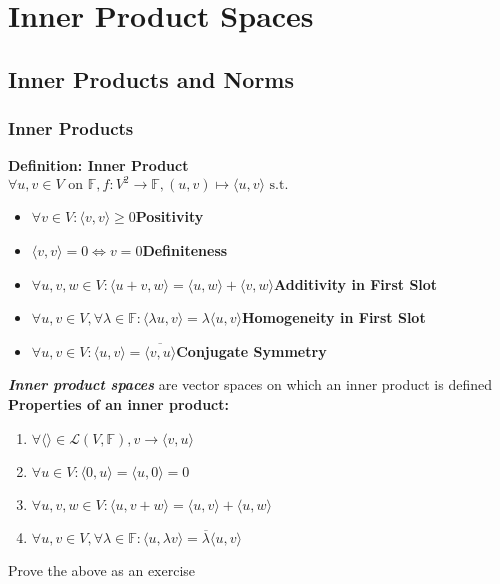 \documentclass{article}
\newcommand{\F}{\mathbb{F}}
\newcommand{\st}{\mbox{ s.t. }}
\newcommand{\0}{{\bf{0}}}
\begin{document}
\section{Inner Product Spaces}
\subsection{Inner Products and Norms}
\subsubsection{Inner Products}
\textbf{Definition: Inner Product}\\
$\forall u,v\in V\mbox{ on }\F,f:V^2\to\F,(u,v)\mapsto\langle u,v\rangle\st$
\begin{itemize}
    \item $\forall v\in V:\langle v,v\rangle\geq0$\null\hfill{\textbf{Positivity}}
    \item $\langle v,v\rangle=0\iff v=0$\null\hfill{\textbf{Definiteness}}
    \item $\forall u,v,w\in V:\langle u+v,w\rangle=\langle u,w\rangle+\langle v,w\rangle$\null\hfill{\textbf{Additivity in First Slot}}
    \item $\forall u,v\in V,\forall\lambda\in\F:\langle \lambda u,v\rangle=\lambda\langle u,v\rangle$\null\hfill{\textbf{Homogeneity in First Slot}}
    \item $\forall u,v\in V:\langle u,v\rangle=\overline{\langle v,u\rangle}$\null\hfill{\textbf{Conjugate Symmetry}}
\end{itemize}
\textit{\textbf{Inner product spaces}} are vector spaces on which an inner product is defined\\
\textbf{Properties of an inner product:}
\begin{enumerate}
    \item $\forall\langle\rangle\in\mathcal{L}(V,\F),v\to\langle v,u\rangle$
    \item $\forall u\in V:\langle0,u\rangle=\langle u,0\rangle=0$
    \item $\forall u,v,w\in V:\langle u,v+w\rangle=\langle u,v\rangle+\langle u,w\rangle$
    \item $\forall u,v\in V,\forall\lambda\in\F:\langle u,\lambda v\rangle=\overline{\lambda}\langle u,v\rangle$
\end{enumerate}
\null\hfill{Prove the above as an exercise}
\end{document}
